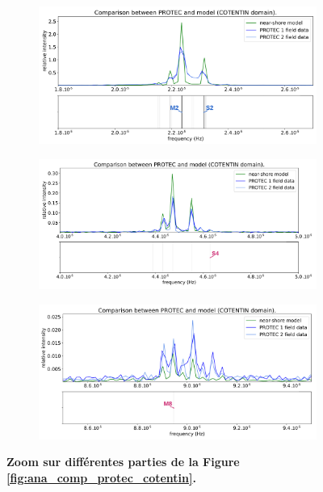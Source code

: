 \documentclass[10pt,a4paper,titlepage]{article}
\begin{document}
\begin{figure}[H]
	\centering
	\begin{subfigure}{0.45\linewidth}
		\centering
		\includegraphics[scale=0.22]{../images/post_traitement/COTENTIN_analyse_near-shore_zoom1.pdf}
	\end{subfigure}
	\begin{subfigure}{0.45\linewidth}
		\centering
		\includegraphics[scale=0.22]{../images/post_traitement/COTENTIN_analyse_near-shore_zoom2.pdf}
	\end{subfigure}
	\begin{subfigure}{0.45\linewidth}
		\centering
		\includegraphics[scale=0.22]{../images/post_traitement/COTENTIN_analyse_near-shore_zoom3.pdf}
	\end{subfigure}
	\caption{
		\textbf{Zoom sur différentes parties de la Figure \ref{fig:ana_comp_protec_cotentin}.}
	}
	\label{fig:ana_comp_protec_cotentin_zoom}
\end{figure}
\end{document}
